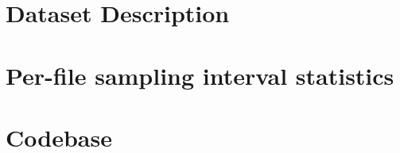 \chapter{Dataset Description}
\label{app:dataset_description}


\chapter{Per-file sampling interval statistics}
\label{app:delta_statistics}


\chapter{Codebase}
\label{app:excluded_files}




